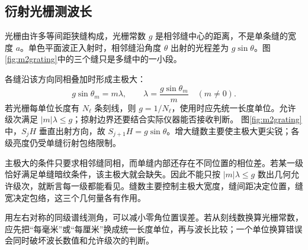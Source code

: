\subsection{衍射光栅测波长}

光栅由许多等间距狭缝构成，光栅常数 \(g\) 是相邻缝中心的距离，不是单条缝的宽度 \(a\)。单色平面波正入射时，相邻缝沿角度 \(\theta\) 出射的光程差为 \(g\sin\theta\)。图\ref{fig:m2grating}中的三个缝只是多缝中的一小段。

各缝沿该方向同相叠加时形成主极大：
\[
 \boxed{g\sin\theta_m=m\lambda},\qquad
 \boxed{\lambda=\frac{g\sin\theta_m}{m}}\quad(m\ne0).
\]
若光栅每单位长度有 \(N_\ell\) 条刻线，则 \(g=1/N_\ell\)，使用时应先统一长度单位。允许级次满足 \(|m|\lambda\le g\)；掠射边界还要结合实际仪器能否接收判断。
图\ref{fig:m2grating}中，\(S_jH\) 垂直出射方向，故 \(S_{j+1}H=g\sin\theta\)。增大缝数主要使主极大更尖锐；各级亮度仍受单缝衍射包络限制。

主极大的条件只要求相邻缝同相，而单缝内部还存在不同位置的相位差。若某一级恰好满足单缝暗纹条件，该主极大就会缺失。因此不能只按 $|m|\lambda\le g$ 数出几何允许级次，就断言每一级都能看见。缝数主要控制主极大宽度，缝间距决定位置，缝宽决定包络，这三个几何量各有作用。

用左右对称的同级谱线测角，可以减小零角位置误差。若从刻线数换算光栅常数，应先把“每毫米”或“每厘米”换成统一长度单位，再与波长比较；一个单位换算错误会同时破坏波长数值和允许级次的判断。

